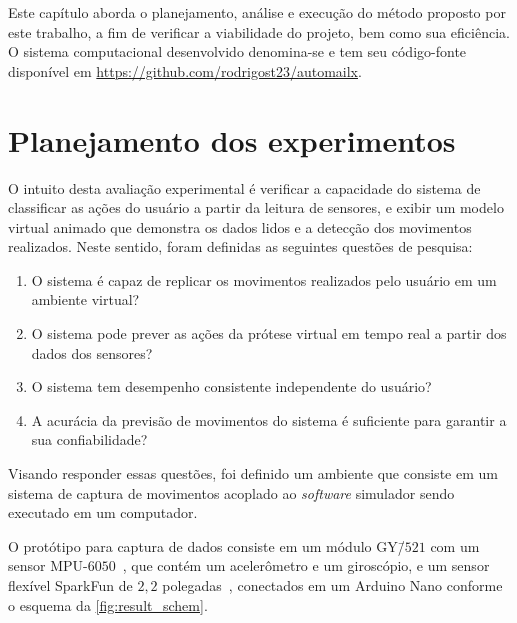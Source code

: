 Este capítulo aborda o planejamento, análise e execução do método proposto por este trabalho, a fim de verificar a viabilidade do projeto, bem como sua eficiência. O sistema computacional desenvolvido denomina-se \productname{} e tem seu código-fonte disponível em \url{https://github.com/rodrigost23/automailx}.

%
\section{Planejamento dos experimentos}\label{sec:result_planejamento}
%

O intuito desta avaliação experimental é verificar a capacidade do sistema \productname{} de classificar as ações do usuário a partir da leitura de sensores, e exibir um modelo virtual animado que demonstra os dados lidos e a detecção dos movimentos realizados. Neste sentido, foram definidas as seguintes questões de pesquisa:

\begin{enumerate}[label=\textbf{QP\arabic*:}, ref=QP\arabic*]
    \item O sistema \productname{} é capaz de replicar os movimentos realizados pelo usuário em um ambiente virtual?\label{qp:simula_movimentos}
    \item O sistema \productname{} pode prever as ações da prótese virtual em tempo real a partir dos dados dos sensores?\label{qp:previsao_sensores}
    \item O sistema \productname{} tem desempenho consistente independente do usuário?\label{qp:usuarios_diferentes}
    \item A acurácia da previsão de movimentos do sistema \productname{} é suficiente para garantir a sua confiabilidade?\label{qp:acuracia}
\end{enumerate}

Visando responder essas questões, foi definido um ambiente que consiste em um sistema de captura de movimentos acoplado ao \textit{software} simulador sendo executado em um computador.


O protótipo para captura de dados consiste em um módulo GY\=/\(521\) com um sensor MPU-\(6050\)~\cite{invensense:imu_mpu}, que contém um acelerômetro e um giroscópio, e um sensor flexível SparkFun de \(2{,}2\) polegadas~\cite{spectrasymbol:flex_sensor}, conectados em um Arduino Nano conforme o esquema da \autoref{fig:result_schem}.

